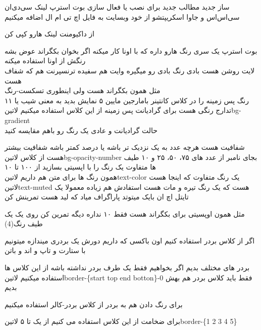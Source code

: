 \documentclass{article}
\begin{document}
	‌ساز
	‌جدید
	‌مطالب
	‌جدید
		برای نصب یا فعال سازی بوت استرپ لینک سی‌دی‌ان سی‌اس‌اس و جاوا اسکریپتشو از خود وبسایت به فایل اچ تی ام ال اضافه میکنیم
		
		از داکیومنت لینک هارو کپی کن
		
		بوت استرپ یک سری رنگ هارو داره که با اونا کار میکنه اگر بخوان بکگراند عوض بشه رنگش از اونا استفاده میکنه\\
		لایت روشن هست بادی رنگ بادی رو میگیره وایت هم سفیده ترنسپرنت هم که شفاف هست\\
		مثل همون بکگراند هست ولی اینطوری تسکست-رنگ\\
			۱۱ رنگ پس زمینه را در کلاس کانتینر بامارجین مایین ۵ نمایش بدید
		 به معنی شیب یا تدارج رنگی هست برای گرادیانت پس زمینه از این کلاس استفاده میکنیم ‌لاتین{bg-gradient}\\
		حالت گرادیانت و عادی یک رنگ رو باهم مقایسه کنید
		
		 شفافیت هست هرچه عدد به یک نزدیک تر باشه یا درصد کمتر باشه شفافیت بیشتر هست  از کلاس ‌لاتین{bg-opacity-number} 
		بجای نامبر از عدد های ۷۵، ۵۰، ۲۵ و ۱۰ 
		 طیف ها متفاوت یک رنگ را با اپسیتی بسازید از ۱۰۰ تا ۱۰ \\
		
		 همون رنگ ها برای متن هم داریم ‌لاتین{text-color} یک رنگ متفاوت که اینجا هست ‌لاتین{text-muted} هست که 
		یک رنگ تیره و مات هست استفادش هم زیاده معمولا یک تایتل اچ ان بایک میتوتد پاراگراف میاد که لید هست تمرینش کن
		
		 مثل همون اوپسیتی برای بکگراند هست فقط ۱۰ نداره دیگه تمرین کن روی یک یک طیف رنگ(4)
		
		 اگر از کلاس بردر استفاده کنیم اون باکسی که داریم دورش یک بردری میندازه میتونیم با ستارت و تاپ و اند و باتن
		
		بردر های مختلف بدیم اگر بخواهیم فقط یک طرف بردر نداشته باشه از این کلاس ها استفاده میکنیم
		‌لاتین{border-\{start top end botton\}-0} فقط باید کلاس بردر هم بهش بدیم
		
		 برای رنگ دادن هم به بردر از کلاس بردر-کالر استفاده میکنیم
		
		 برای ضخامت از این کلاس استفاده می کنیم از یک تا ۵ ‌لاتین{border-\{1 2 3 4 5\}}
		
\end{document}
